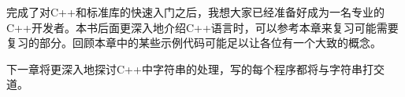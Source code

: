 完成了对C++和标准库的快速入门之后，我想大家已经准备好成为一名专业的C++开发者。本书后面更深入地介绍C++语言时，可以参考本章来复习可能需要复习的部分。回顾本章中的某些示例代码可能足以让各位有一个大致的概念。

下一章将更深入地探讨C++中字符串的处理，写的每个程序都将与字符串打交道。
